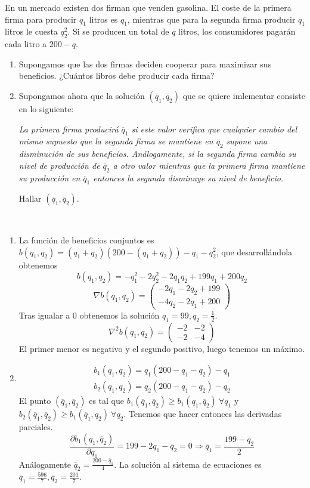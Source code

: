\documentclass[twoside]{article}
\begin{document}
\begin{ejercicio}{11}
En un mercado existen dos firman que venden gasolina. El coste de la primera firma para producir $q_1$ litros es $q_1$, mientras que para la segunda firma producir $q_1$ litros le cuesta $q_2^2$. Si se producen un total de $q$ litros, los consumidores pagarán cada litro a $200-q$.
\begin{enumerate}
\item Supongamos que las dos firmas deciden cooperar para maximizar sus beneficios. ¿Cuántos libros debe producir cada firma?
\item Supongamos ahora que la solución $(\overline{q}_1,\overline{q}_2)$ que se quiere imlementar consiste en lo siguiente:

\emph{La primera firma producirá $\overline{q}_1$ si este valor verifica que cualquier cambio del mismo supuesto que la segunda firma se mantiene en $\overline{q}_2$ supone una disminución de sus beneficios. Análogamente, si la segunda firma cambia su nivel de producción de $\overline{q}_2$ a otro valor mientras que la primera firma mantiene su producción en $\overline{q}_1$ entonces la segunda disminuye su nivel de beneficio.}

Hallar $(\overline{q}_1,\overline{q}_2)$.
\end{enumerate}
\begin{solucion}\
\begin{enumerate}


\item La función de beneficios conjuntos es $b(q_1,q_2)=(q_1+q_2)(200-(q_1+q_2))-q_1-q_2^2$, que desarrollándola obtenemos
$$b(q_1,q_2)=-q_1^2-2q_2^2-2q_1q_2+199q_1+200q_2$$
$$\nabla b(q_1,q_2)=\begin{pmatrix}
-2q_1-2q_2+199\\
-4q_2-2q_1+200
\end{pmatrix}$$
Tras igualar a 0 obtenemos la solución $q_1=99,q_2=\frac{1}{2}$. 
$$\nabla^2b(q_1,q_2)=\begin{pmatrix}
-2 & -2\\
-2 & -4
\end{pmatrix}$$
El primer menor es negativo y el segundo positivo, luego tenemos un máximo.
\item 
\begin{gather*}
b_1(q_1,q_2)=q_1(200-q_1-q_2)-q_1\\
b_2(q_1,q_2)=q_2(200-q_1-q_2)-q_2
\end{gather*}
El punto $(\overline{q}_1,\overline{q}_2)$ es tal que $b_1(\overline{q}_1,\overline{q}_2)\geq b_1(q_1,\overline{q}_2)\ \forall q_1$ y $b_2(\overline{q}_1,\overline{q}_2)\geq b_1(\overline{q}_1,q_2)\ \forall q_2$. Tenemos que hacer entonces las derivadas parciales.
$$\frac{\partial b_1(q_1,\overline{q}_2)}{\partial q_1}=199-2q_1-\overline{q}_2=0\Rightarrow \overline{q}_1=\frac{199-\overline{q}_2}{2}$$
Análogamente $\overline{q}_2=\frac{200-\overline{q}_1}{4}$. La solución al sistema de ecuaciones es $\overline{q}_1=\frac{596}{7},\overline{q}_2=\frac{201}{7}$.
\end{enumerate}
\end{solucion}
\end{ejercicio}
\end{document}
